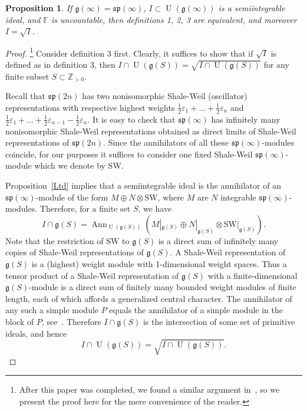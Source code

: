 \documentclass{emsprocart}
\newtheorem{proposition}[theorem]{Proposition}
\begin{document}
\begin{proposition}\label{P2X}If $\mathfrak g(\infty)=\mathfrak{sp}(\infty)$, $I\subset\operatorname{U}(\mathfrak g(\infty))$ is a semiintegrable ideal, and $\mathbb F$ is uncountable, then definitions 1, 2, 3 are equivalent, and moreover $I=\sqrt I$.\end{proposition}
\begin{proof}\footnote{After this paper was completed, we found a similar argument in~\cite[Chapter~9]{MCR}, so we present the proof here for the mere convenience of the reader.} Consider definition 3 first. Clearly, it suffices to show that if $\sqrt I$ is defined as in definition 3, then $I\cap\operatorname{U}(\mathfrak g(S))=\sqrt{I\cap\operatorname{U}(\mathfrak g(S))}$ for any finite subset $S\subset\mathbb Z_{>0}$.

Recall that $\mathfrak{sp}(2n)$ has two nonisomorphic Shale-Weil (oscillator) representations with respective highest weights $\frac12\varepsilon_1+...+\frac12\varepsilon_n$ and $\frac12\varepsilon_1+...+\frac12\varepsilon_{n-1}-\frac12\varepsilon_n$. It is easy to check that $\mathfrak{sp}(\infty)$ has infinitely many nonisomorphic Shale-Weil representations obtained as direct limits of Shale-Weil representations of $\mathfrak{sp}(2n)$. Since the annihilators of all these $\mathfrak{sp}(\infty)$-modules coincide, for our purposes  it suffices to consider one fixed Shale-Weil $\mathfrak{sp}(\infty)$-module which we denote by SW.

Proposition~\ref{Ltd} implies that a semiintegrable ideal is the annihilator of an $\mathfrak{sp}(\infty)$-module of the form $M\oplus N\otimes\mbox{SW}$, where $M$ are $N$ integrable $\mathfrak{sp}(\infty)$-modules. Therefore, for a finite set $S$, we have
$$I\cap\mathfrak g(S)=\operatorname{Ann}_{\operatorname{U}(\mathfrak g(S))}(M|_{\mathfrak g(S)}\oplus N|_{\mathfrak g(S)}\otimes \mbox{SW}|_{\mathfrak g(S)}).$$
Note that the restriction of $\mbox{SW}$ to $\mathfrak g(S)$ is a direct sum of infinitely many copies of Shale-Weil representations of $\mathfrak g(S)$. A Shale-Weil representation of $\mathfrak g(S)$ is a (highest) weight module with 1-dimensional weight spaces.
Thus a tensor product of a Shale-Weil representation of $\mathfrak g(S)$ with a finite-dimensional $\mathfrak g(S)$-module is a direct sum of finitely many bounded weight modules of finite length, each of which affords a generalized central character. The annihilator of any such a simple module $P$ equals the annihilator of a simple module in the block of $P$, see~\cite[Theorems 5.1, 5.2]{GS}. Therefore $I\cap\mathfrak g(S)$ is the intersection of some set of primitive ideals, and hence \begin{equation}I\cap\operatorname{U}(\mathfrak g(S))=\sqrt{I\cap\operatorname{U}(\mathfrak g(S))}.\label{Erad}\end{equation}



\end{proof}
\end{document}
